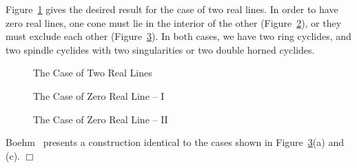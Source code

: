      Figure~\ref{fig:two-real} gives the desired result for the case of two 
real lines.  In order to have zero real lines, 
one cone must lie in the interior of 
the other (Figure~\ref{fig:zero-real-1}), or they must exclude each other
(Figure~\ref{fig:zero-real-2}).  In both cases, we have two ring cyclides,
and two spindle cyclides with two singularities or two double horned cyclides.
\begin{figure}
\vspace{4cm}
\caption{The Case of Two Real Lines}
\label{fig:two-real}
\end{figure}
\begin{figure}
\vspace{4cm}
\caption{The Case of Zero Real Line -- I}
\label{fig:zero-real-1}
\end{figure}
\begin{figure}
\vspace{4cm}
\caption{The Case of Zero Real Line -- II}
\label{fig:zero-real-2}
\end{figure}

\begin{remark} \rm
     Boehm~\cite{boehm:1990}
presents a construction identical to the cases
shown in Figure~\ref{fig:zero-real-2}(a) and (c). $\Box$
\end{remark}

